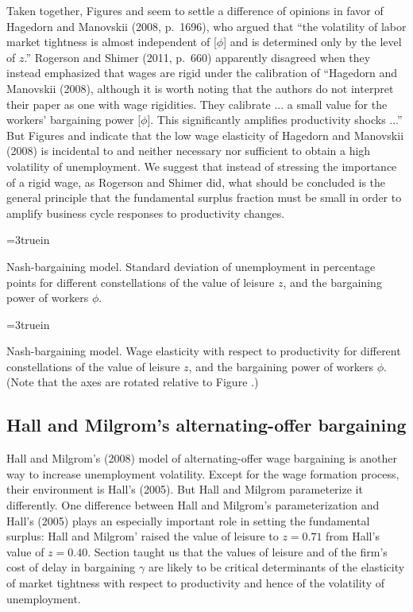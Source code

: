  
Taken together, Figures  and 
seem to settle a difference of opinions in favor of  Hagedorn and Manovskii (2008, p.~1696), who argued
that ``the volatility of labor market tightness is almost independent
of [$\phi$] and is determined only by the level of $z$.''
Rogerson and Shimer (2011, p.~660) apparently disagreed when they instead  emphasized
that wages are rigid under the calibration of ``Hagedorn and
Manovskii (2008), although it is worth noting that the authors
do not interpret their paper as one with wage rigidities. They
calibrate ... a small value for the workers' bargaining power
[$\phi$]. This significantly amplifies productivity shocks ...''
But Figures  and  indicate that  the low wage elasticity of
Hagedorn and Manovskii (2008)
is incidental to and neither necessary nor sufficient to obtain
a high volatility of unemployment. We suggest that instead of stressing the importance of a rigid wage, as Rogerson and Shimer
did, what should be concluded is the general principle that
the fundamental surplus fraction must be small in order to amplify business cycle responses to productivity changes.

\centerline{\epsfxsize=3truein}
\caption{Nash-bargaining model. Standard deviation of unemployment in
percentage points for different
constellations of the value of leisure $z$, and the bargaining
power of workers $\phi$.}
\endfigure

\centerline{\epsfxsize=3truein}
\caption{Nash-bargaining model. Wage elasticity with respect to
productivity for different
constellations of the value of leisure $z$, and the bargaining
power of workers $\phi$. (Note that the axes are rotated relative
to Figure .)}
\endfigure


\subsection{Hall and Milgrom's alternating-offer bargaining}\label{sec:FS_HallMil_simul}%
%
 Hall and Milgrom's (2008)
model of alternating-offer wage bargaining is another way to
increase unemployment volatility. Except for
the wage formation process, their environment is  Hall's (2005). But Hall and Milgrom   parameterize it  differently.
One difference between  Hall and Milgrom's parameterization and  Hall's (2005) plays  an especially  important role in setting  the
 fundamental surplus: Hall and Milgrom' raised the value of leisure  to $z=0.71$ from Hall's value of $z= 0.40$.
 Section  taught us that
the values of leisure and of  the firm's cost of delay in
bargaining $\gamma$ are likely to be critical determinants of
 the elasticity of market tightness with respect
to productivity and hence of the volatility of unemployment.

